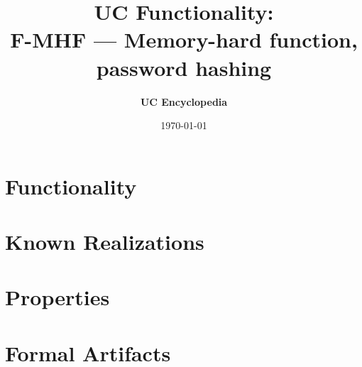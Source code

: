 \documentclass[11pt,a4paper]{article}
\title{\textbf{\Large UC Functionality:}\\[0.2em] \Large F-MHF --- Memory-hard function, password hashing}
\author{\textbf{UC Encyclopedia}}
\date{\today}
\newtheorem{functionality}{Functionality}
\begin{document}
\maketitle

\begin{abstract}
\end{abstract}

\section{Functionality}

%

\section{Known Realizations}


\section{Properties}


\section{Formal Artifacts}

\end{document}

